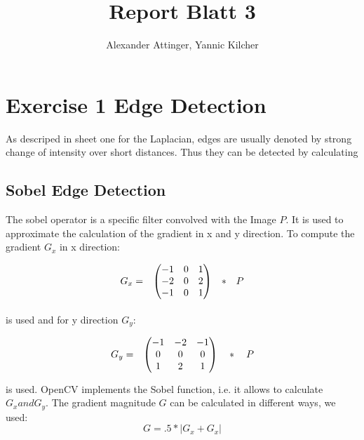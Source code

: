 \documentclass[11pt,a4paper]{article}
\author{Alexander Attinger, Yannic Kilcher}
\title{Report Blatt 3}
\begin{document}
\maketitle
\section{Exercise 1 Edge Detection}
As descriped in sheet one for the Laplacian, edges are usually denoted by strong change of intensity over short distances. Thus they can be detected by calculating

\subsection{Sobel Edge Detection}
The sobel operator is a specific filter convolved with the Image $P$. It is used to approximate the calculation of the gradient in x and y direction. To compute the gradient $G_{x}$ in x direction:

\[
\begin{array}{lcc}
G_{x} = & \left(\begin{array}{@{}ccc@{}}
                    -1 & 0 & 1 \\
                    -2 & 0 & 2 \\
                    -1 & 0 & 1
                  \end{array}\right) & *\quad P\\[15pt]
  
\end{array} 
\]

is used and for y direction $G_{y}$:

\[
\begin{array}{lcc}
G_{y} = & \left(\begin{array}{@{}ccc@{}}
                    -1 & -2 & -1 \\
                    0 & 0 & 0 \\
                    1 & 2 & 1
                  \end{array}\right)\quad *\quad P\\[15pt]
  
\end{array}
\]
 is used. OpenCV implements the Sobel function, i.e. it allows to calculate $G_{x} and G_{y}$. The gradient magnitude $G$ can be calculated in different ways, we used:
 \begin{equation}
 G = .5*\lvert G_{x}+G_{x}\rvert
 \end{equation}
 
\end{document}
